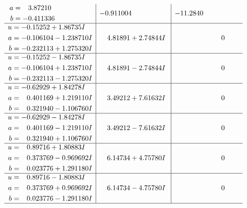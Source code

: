 \documentclass[1p]{elsarticle_modified}
\theoremstyle{definition}
\begin{document}
$$\begin{array}{c|c|c}
\begin{aligned}
a &= \phantom{-}3.87210\phantom{ +0.000000I} \\
b &= -0.411336\phantom{ +0.000000I}\end{aligned}
 & -0.911004\phantom{ +0.000000I} & -11.2840\phantom{ +0.000000I} \\ \hline\begin{aligned}
u &= -0.15252 + 1.86735 I \\
a &= -0.106104 - 1.238710 I \\
b &= -0.232113 + 1.275320 I\end{aligned}
 & \phantom{-}4.81891 + 2.74844 I & \phantom{-0.000000 } 0 \\ \hline\begin{aligned}
u &= -0.15252 - 1.86735 I \\
a &= -0.106104 + 1.238710 I \\
b &= -0.232113 - 1.275320 I\end{aligned}
 & \phantom{-}4.81891 - 2.74844 I & \phantom{-0.000000 } 0 \\ \hline\begin{aligned}
u &= -0.62929 + 1.84278 I \\
a &= \phantom{-}0.401169 + 1.219110 I \\
b &= \phantom{-}0.321940 - 1.106760 I\end{aligned}
 & \phantom{-}3.49212 + 7.61632 I & \phantom{-0.000000 } 0 \\ \hline\begin{aligned}
u &= -0.62929 - 1.84278 I \\
a &= \phantom{-}0.401169 - 1.219110 I \\
b &= \phantom{-}0.321940 + 1.106760 I\end{aligned}
 & \phantom{-}3.49212 - 7.61632 I & \phantom{-0.000000 } 0 \\ \hline\begin{aligned}
u &= \phantom{-}0.89716 + 1.80883 I \\
a &= \phantom{-}0.373769 - 0.969692 I \\
b &= \phantom{-}0.023776 + 1.291180 I\end{aligned}
 & \phantom{-}6.14734 + 4.75780 I & \phantom{-0.000000 } 0 \\ \hline\begin{aligned}
u &= \phantom{-}0.89716 - 1.80883 I \\
a &= \phantom{-}0.373769 + 0.969692 I \\
b &= \phantom{-}0.023776 - 1.291180 I\end{aligned}
 & \phantom{-}6.14734 - 4.75780 I & \phantom{-0.000000 } 0\\
 \hline 
 \end{array}$$\newpage\newpage\renewcommand{\arraystretch}{1}
\end{document}
